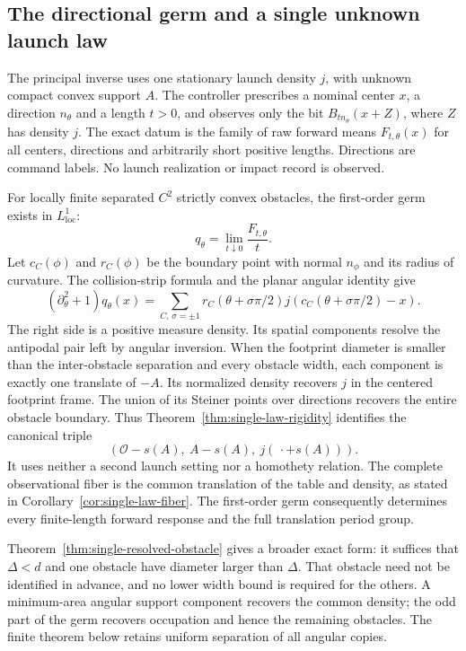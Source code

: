 \subsection{The directional germ and a single unknown launch law}
The principal inverse uses one stationary launch density $j$, with
unknown compact convex support $A$. The controller prescribes a nominal
center $x$, a direction $n_\theta$ and a length $t>0$, and observes only
the bit $B_{tn_\theta}(x+Z)$, where $Z$ has density $j$. The exact datum
is the family of raw forward means $F_{t,\theta}(x)$ for all centers,
directions and arbitrarily short positive lengths. Directions are
command labels. No launch realization or impact record is observed.

For locally finite separated $C^2$ strictly convex obstacles, the
first-order germ exists in $L^1_{\mathrm{loc}}$:
\begin{equation}\label{eq:intro-single-germ}
 q_\theta=\lim_{t\downarrow0}\frac{F_{t,\theta}}t.
\end{equation}
Let $c_C(\phi)$ and $r_C(\phi)$ be the boundary point with normal
$n_\phi$ and its radius of curvature. The collision-strip formula and
the planar angular identity give
\begin{equation}\label{eq:intro-single-normal}
 (\partial_\theta^2+1)q_\theta(x)
 =\sum_{C,\,\sigma=\pm1}r_C(\theta+\sigma\pi/2)
                     j(c_C(\theta+\sigma\pi/2)-x).
\end{equation}
The right side is a positive measure density. Its spatial components
resolve the antipodal pair left by angular inversion. When the
footprint diameter is smaller than the inter-obstacle separation and
every obstacle width, each component is exactly one translate of
$-A$. Its normalized density recovers $j$ in the centered footprint
frame. The union of its Steiner points over directions recovers the
entire obstacle boundary. Thus
Theorem~\ref{thm:single-law-rigidity} identifies the canonical triple
\begin{equation}\label{eq:intro-single-triple}
       (\mathcal O-s(A),\ A-s(A),\ j(\,\cdot+s(A))).
\end{equation}
It uses neither a second launch setting nor a homothety relation.
The complete observational fiber is the common translation of the
table and density, as stated in Corollary~\ref{cor:single-law-fiber}.
The first-order germ consequently determines every finite-length
forward response and the full translation period group.

Theorem~\ref{thm:single-resolved-obstacle} gives a broader exact
form: it suffices that $\Delta<d$ and one obstacle have diameter
larger than $\Delta$. That obstacle need not be identified in
advance, and no lower width bound is required for the others.
A minimum-area angular support component recovers the common density;
the odd part of the germ recovers occupation and hence the remaining
obstacles. The finite theorem below retains uniform separation of
all angular copies.

